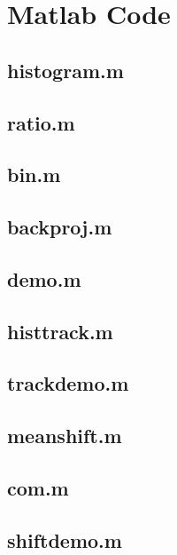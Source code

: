 \documentclass{article}
\begin{document}
\section{Matlab Code}

\subsection{histogram.m}



\subsection{ratio.m}



\subsection{bin.m}



\subsection{backproj.m}



\subsection{demo.m}



\subsection{histtrack.m}



\subsection{trackdemo.m}



\subsection{meanshift.m}



\subsection{com.m}



\subsection{shiftdemo.m}


\end{document}
